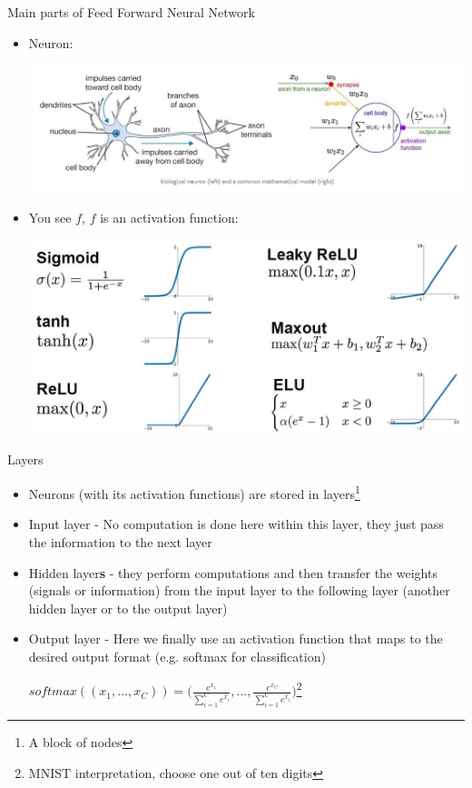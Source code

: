 \documentclass[aspectratio=169]{beamer}
\begin{document}
\begin{frame}{Main parts of Feed Forward Neural Network}
    \begin{itemize}
        \item Neuron: 
        \begin{center}
            \includegraphics[scale=0.4]{./images/neuron.JPG}
        \end{center}
        \item You see $f$, $f$ is an activation function:
         \begin{center}
            \includegraphics[scale=0.2]{./images/activation.JPG}
        \end{center}
    \end{itemize}
\end{frame}
\begin{frame}{Layers}
    \begin{itemize}
        \item Neurons (with its activation functions) are stored in layers\footnote{A block of nodes}
        \item Input layer - No computation is done here within this layer, they just pass the information to the next layer
        \item Hidden layer\textbf{s} - they perform computations and then transfer the weights (signals or information) from the input layer to the following layer (another hidden layer or to the output layer)
        \item Output layer - Here we finally use an activation function that maps to the desired output format (e.g. softmax for classification)
        \begin{center}
            $softmax((x_1, ..., x_C)) = \Big(\frac{e^{x_1}}{\sum_{i=1}^C e^{x_i}}, ..., \frac{e^{x_C}}{\sum_{i=1}^C e^{x_i}}\Big)$\footnote{MNIST interpretation, choose one out of ten digits}
        \end{center}
    \end{itemize}
\end{frame}
\end{document}
